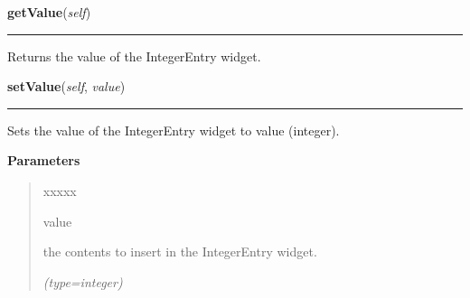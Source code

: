     \label{nMOLDYN:GUI:Widgets:ComboIntegerEntry:getValue}

    \vspace{0.5ex}

\hspace{.8\funcindent}\begin{boxedminipage}{\funcwidth}

    \raggedright \textbf{getValue}(\textit{self})

    \vspace{-1.5ex}

    \rule{\textwidth}{0.5\fboxrule}
\setlength{\parskip}{2ex}
    Returns the value of the IntegerEntry widget.

\setlength{\parskip}{1ex}
    \end{boxedminipage}

    \label{nMOLDYN:GUI:Widgets:ComboIntegerEntry:setValue}

    \vspace{0.5ex}

\hspace{.8\funcindent}\begin{boxedminipage}{\funcwidth}

    \raggedright \textbf{setValue}(\textit{self}, \textit{value})

    \vspace{-1.5ex}

    \rule{\textwidth}{0.5\fboxrule}
\setlength{\parskip}{2ex}
    Sets the value of the IntegerEntry widget to {\textbar}value{\textbar} 
    (integer).

\setlength{\parskip}{1ex}
      \textbf{Parameters}
      \vspace{-1ex}

      \begin{quote}
        \begin{Ventry}{xxxxx}

          \item[value]

          the contents to insert in the IntegerEntry widget.

            {\it (type=integer)}

        \end{Ventry}

      \end{quote}

    \end{boxedminipage}


